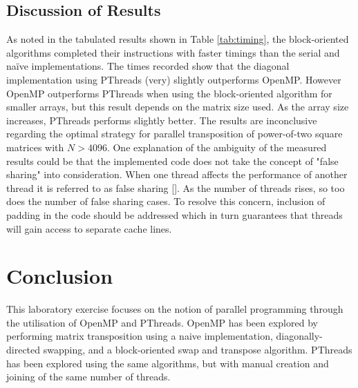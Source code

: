 \documentclass[10 pt, conference]{cssconf}
\begin{document}
\begin{multicols}{2}
\subsection{Discussion of Results}
As noted in the tabulated results shown in Table \ref{tab:timing}, the block-oriented algorithms completed their instructions with faster timings than the serial and na\"ive implementations. The times recorded show that the diagonal implementation using PThreads (very) slightly outperforms OpenMP. However OpenMP outperforms PThreads when using the block-oriented algorithm for smaller arrays, but this result depends on the matrix size used. As the array size increases, PThreads performs slightly better. The results are inconclusive regarding the optimal strategy for parallel transposition of power-of-two square matrices with $N>4096$. One explanation of the ambiguity of the measured results could be that the implemented code does not take the concept of "false sharing" into consideration. When one thread affects the performance of another thread it is referred to as false sharing [\cite{FalseSharing:URL}]. As the number of threads rises, so too does the number of false sharing cases. To resolve this concern, inclusion of padding in the code should be addressed which in turn guarantees that threads will gain access to separate cache lines. 
\vspace{20pt} %

\section{Conclusion}
This laboratory exercise focuses on the notion of parallel programming through the utilisation of OpenMP and PThreads. OpenMP has been explored by performing matrix transposition using a naive implementation, diagonally-directed swapping, and a block-oriented swap and transpose algorithm. PThreads has been explored using the same algorithms, but with manual creation and joining of the same number of threads. 

\balance
\end{multicols}

\vfill



\end{document}
